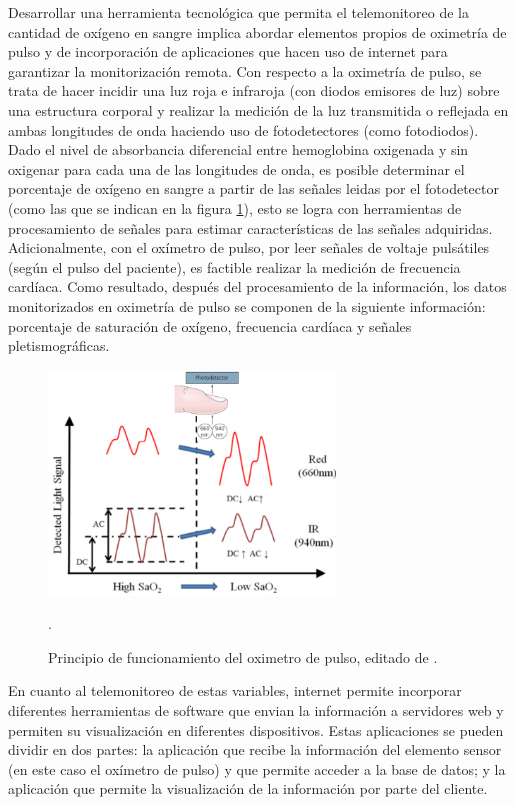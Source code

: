 \documentclass[journal]{IEEEtran}
\begin{document}
Desarrollar una herramienta tecnológica que permita el telemonitoreo de la cantidad de oxígeno en sangre implica abordar elementos propios de oximetría de pulso y de incorporación de aplicaciones que hacen uso de internet para garantizar la monitorización remota. Con respecto a la oximetría de pulso, se trata de hacer incidir una luz roja e infraroja (con diodos emisores de luz) sobre una estructura corporal y realizar la medición de la luz transmitida o reflejada en ambas longitudes de onda haciendo uso de fotodetectores (como fotodiodos). Dado el nivel de absorbancia diferencial entre hemoglobina oxigenada y sin oxigenar para cada una de las longitudes de onda, es posible determinar el porcentaje de oxígeno en sangre a partir de las señales leidas por el fotodetector (como  las que se indican en la figura \ref{principio_funcionamiento}), esto se logra con herramientas de procesamiento de señales para estimar características de las señales adquiridas.  Adicionalmente, con el oxímetro de pulso, por leer señales de voltaje pulsátiles (según el pulso del paciente), es factible realizar la medición de frecuencia cardíaca. Como resultado, después del procesamiento de la información,  los datos monitorizados en oximetría de pulso se componen de la siguiente información: porcentaje de saturación de oxígeno, frecuencia cardíaca y señales pletismográficas.

\begin{figure}[!h]
	\centering
	\includegraphics[width=3in]{principio_funcionamiento.png}
	\caption{Principio de funcionamiento del oximetro de pulso, editado de \cite{B_reflectance_pulse_oximetry}. }.
	\label{principio_funcionamiento}
\end{figure}


En cuanto al telemonitoreo de estas variables, internet permite incorporar diferentes herramientas de software que envian la información a servidores web y permiten su visualización en diferentes dispositivos.  Estas aplicaciones se pueden dividir en dos partes: la aplicación que recibe la información del elemento sensor (en este caso el oxímetro de pulso) y que permite acceder a la base de datos; y la aplicación que permite la visualización de la información por parte del cliente.
\end{document}
